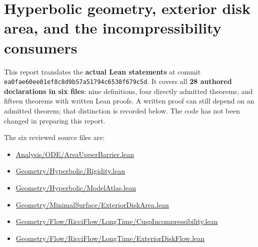 \documentclass[
  letterpaper,
  11pt]{article}
\providecommand{\tightlist}{%
  \setlength{\itemsep}{0pt}\setlength{\parskip}{0pt}}
\begin{document}
\section{Hyperbolic geometry, exterior disk area, and the
incompressibility
consumers}\label{hyperbolic-geometry-exterior-disk-area-and-the-incompressibility-consumers}

This report translates the \textbf{actual Lean statements} at commit
{\small\texttt{ea0fae6\allowbreak{}0ee01ef8\allowbreak{}c8d9b57a\allowbreak{}51794c65\allowbreak{}38f679c5\allowbreak{}d}}.
It covers all \textbf{28 authored declarations in six files}: nine
definitions, four directly admitted theorems, and fifteen theorems with
written Lean proofs. A written proof can still depend on an admitted
theorem; that distinction is recorded below. The code has not been
changed in preparing this report.

The six reviewed source files are:

\begin{itemize}
\tightlist
\item
  \href{https://github.com/qinz1yang/differential-geometry-dev/blob/ea0fae60ee01ef8c8d9b57a51794c6538f679c5d/DifferentialGeometry/Analysis/ODE/AreaUpperBarrier.lean}{Analysis/ODE/AreaUpperBarrier.lean}
\item
  \href{https://github.com/qinz1yang/differential-geometry-dev/blob/ea0fae60ee01ef8c8d9b57a51794c6538f679c5d/DifferentialGeometry/Geometry/Hyperbolic/Rigidity.lean}{Geometry/Hyperbolic/Rigidity.lean}
\item
  \href{https://github.com/qinz1yang/differential-geometry-dev/blob/ea0fae60ee01ef8c8d9b57a51794c6538f679c5d/DifferentialGeometry/Geometry/Hyperbolic/ModelAtlas.lean}{Geometry/Hyperbolic/ModelAtlas.lean}
\item
  \href{https://github.com/qinz1yang/differential-geometry-dev/blob/ea0fae60ee01ef8c8d9b57a51794c6538f679c5d/DifferentialGeometry/Geometry/MinimalSurface/ExteriorDiskArea.lean}{Geometry/MinimalSurface/ExteriorDiskArea.lean}
\item
  \href{https://github.com/qinz1yang/differential-geometry-dev/blob/ea0fae60ee01ef8c8d9b57a51794c6538f679c5d/DifferentialGeometry/Geometry/Flow/RicciFlow/LongTime/CuspIncompressibility.lean}{Geometry/Flow/RicciFlow/LongTime/CuspIncompressibility.lean}
\item
  \href{https://github.com/qinz1yang/differential-geometry-dev/blob/ea0fae60ee01ef8c8d9b57a51794c6538f679c5d/DifferentialGeometry/Geometry/Flow/RicciFlow/LongTime/ExteriorDiskFlow.lean}{Geometry/Flow/RicciFlow/LongTime/ExteriorDiskFlow.lean}
\end{itemize}
\end{document}
